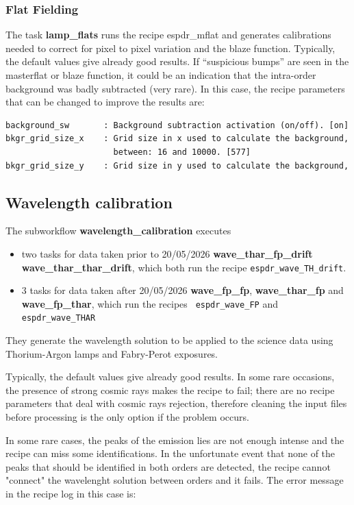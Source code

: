 \subsubsection{Flat Fielding}

The task {\bf lamp\_flats} runs the recipe espdr\_mflat and generates
calibrations needed to correct for pixel to pixel variation and the
blaze function. Typically, the default values give already good
results. If ``suspicious bumps'' are seen in the masterflat or blaze
function, it could be an indication that the intra-order background
was badly subtracted (very rare). In this case, the recipe parameters
that can be changed to improve the results are:

\begin{verbatim}
background_sw       : Background subtraction activation (on/off). [on]
bkgr_grid_size_x    : Grid size in x used to calculate the background,
                      between: 16 and 10000. [577]
bkgr_grid_size_y    : Grid size in y used to calculate the background,
\end{verbatim}

\subsection{Wavelength calibration}

The subworkflow {\bf wavelength\_calibration} executes
\begin{itemize}
\item two tasks for data taken prior to 20/05/2026 {\bf
  wave\_thar\_fp\_drift} {\bf wave\_thar\_thar\_drift}, which both run the recipe
  {\tt espdr\_wave\_TH\_drift}.

\item 3 tasks for data taken after 20/05/2026 {\bf wave\_fp\_fp}, {\bf
  wave\_thar\_fp} and {\bf wave\_fp\_thar}, which run the recipes {\tt
  espdr\_wave\_FP} and {\tt espdr\_wave\_THAR}
\end{itemize}

  They generate the wavelength solution to
be applied to the science data using Thorium-Argon lamps and
Fabry-Perot exposures.

 Typically, the default values give already good results.  In some
 rare occasions, the presence of strong cosmic rays makes the recipe
 to fail; there are no recipe parameters that deal with cosmic rays
 rejection, therefore cleaning the input files before processing is
 the only option if the problem occurs.

In some rare cases, the peaks of the emission lies are not enough
intense and the recipe can miss some identifications. In the
unfortunate event that none of the peaks that should be identified in
both orders are detected, the recipe cannot "connect" the wavelenght
solution between orders and it fails. The error message in the recipe
log in this case is:

